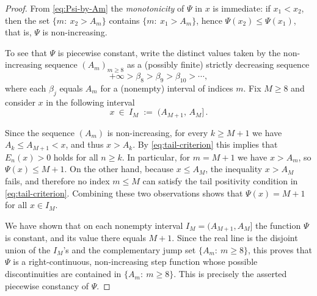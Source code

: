 \documentclass[10pt]{amsart}
\theoremstyle{definition} %
\numberwithin{equation}{section}
\begin{document}
\begin{proof}
From \eqref{eq:Psi-by-Am} the \emph{monotonicity} of $\Psi$ in $x$ is immediate:
if $x_1<x_2$, then the set $\{m:\ x_2>A_m\}$ contains $\{m:\ x_1>A_m\}$, hence
$\Psi(x_2)\le \Psi(x_1)$, that is, $\Psi$ is non-increasing.

To see that $\Psi$ is piecewise constant, write the distinct values taken by the
non-increasing sequence $(A_m)_{m\ge 8}$ as a (possibly finite) strictly decreasing sequence
\[
+\infty > \beta_8 > \beta_9 > \beta_{10} > \cdots,
\]
where each $\beta_j$ equals $A_m$ for a (nonempty) interval of indices $m$.
Fix $M\ge 8$ and consider $x$ in the following interval
\begin{equation}\label{eq:const-interval}
x\ \in\ I_M\;:=\;(A_{M+1},\,A_M]\,.
\end{equation}

Since the sequence $(A_m)$ is non-increasing, for every $k\ge M+1$ we have 
$A_k\le A_{M+1}<x$, and thus $x>A_k$. By \eqref{eq:tail-criterion} this implies that $E_n(x)>0$ holds for all $n\ge k$. In particular, for $m=M+1$ we have $x>A_m$, so $\Psi(x)\le M+1$. On the other hand, because $x\le A_M$, the inequality 
$x>A_M$ fails, and therefore no index $m\le M$ can satisfy the tail positivity 
condition in \eqref{eq:tail-criterion}. Combining these two observations shows that 
$\Psi(x)=M+1$ for all $x\in I_M$.

We have shown that on each nonempty interval $I_M=(A_{M+1},A_M]$ the function $\Psi$ is constant,
and its value there equals $M+1$. Since the real line is the disjoint union of the $I_M$’s and the
complementary jump set $\{A_m:\ m\ge 8\}$, this proves that $\Psi$ is a right-continuous,
non-increasing step function whose possible discontinuities are contained in $\{A_m:\ m\ge 8\}$.
This is precisely the asserted piecewise constancy of $\Psi$.
\end{proof}


\end{document}
